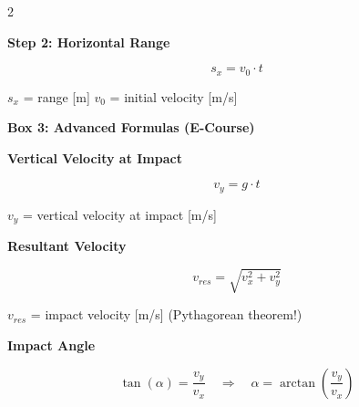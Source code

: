 \documentclass[10pt, a4paper]{article}
\newcommand{\fachfarbe}{physik}
\newcommand{\abschnitt}[1]{%
    \vspace{8pt}
    \noindent\textbf{\textcolor{\fachfarbe}{#1}}
    \vspace{4pt}
}
\begin{document}
\begin{multicols}{2}
\vspace{4pt}

\begin{formelbox}
\textbf{Step 2: Horizontal Range}
\vspace{2pt}

\begin{equation*}
s_x = v_0 \cdot t
\end{equation*}

\vspace{2pt}
\footnotesize
$s_x$ = range [m] \quad $v_0$ = initial velocity [m/s]
\end{formelbox}

\vspace{4pt}


\abschnitt{Box 3: Advanced Formulas (E-Course)}

\begin{formelbox}
\textbf{Vertical Velocity at Impact}
\vspace{2pt}

\begin{equation*}
v_y = g \cdot t
\end{equation*}

\vspace{2pt}
\footnotesize
$v_y$ = vertical velocity at impact [m/s]
\end{formelbox}

\vspace{4pt}

\begin{formelbox}
\textbf{Resultant Velocity}
\vspace{2pt}

\begin{equation*}
v_{res} = \sqrt{v_x^2 + v_y^2}
\end{equation*}

\vspace{2pt}
\footnotesize
$v_{res}$ = impact velocity [m/s] \quad (Pythagorean theorem!)
\end{formelbox}

\vspace{4pt}

\begin{formelbox}
\textbf{Impact Angle}
\vspace{2pt}

\begin{equation*}
\tan(\alpha) = \frac{v_y}{v_x} \quad \Rightarrow \quad \alpha = \arctan\left(\frac{v_y}{v_x}\right)
\end{equation*}


\end{formelbox}
\end{multicols}
\end{document}
